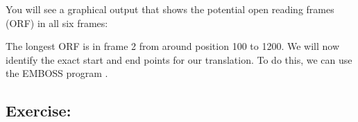 \documentclass[12pt]{report}
\begin{document}
You will see a graphical output that shows the potential open reading
frames (ORF) in all six frames:

\begin{figure}[H]
\begin{center}
\end{center}
\label{fig:plotorf}
\end{figure}

The longest ORF is in frame 2 from around position 100 to 1200. We
will now identify the exact start and end points for our
translation. To do this, we can use the EMBOSS program
.

\subsection*{Exercise: }
\end{document}
